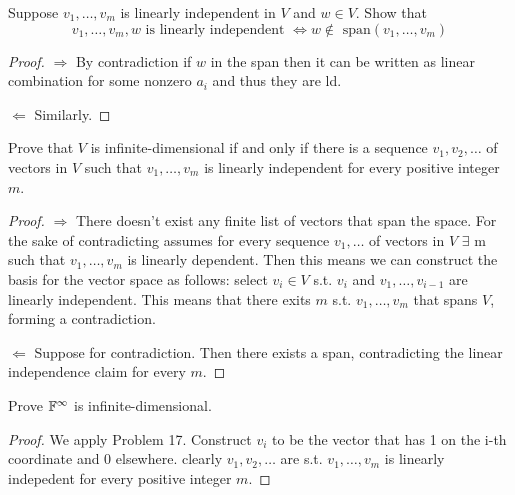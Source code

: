 \documentclass{extarticle}
\begin{document}
\begin{problem}{13}
    Suppose \(v_1, \ldots, v_m\) is linearly independent in \(V\) and 
    \(w \in V\). Show that 
    \[v_1, \ldots, v_m, w \text{ is linearly independent } \Leftrightarrow 
    w \notin \text{ span}(v_1, \ldots, v_m)\]
\end{problem}

\begin{proof}
\(\Rightarrow\) By contradiction if \(w\) in the span then it can be written 
as linear combination for some nonzero \(a_i\) and thus they are ld. 

\(\Leftarrow\) Similarly. 
\end{proof}


\begin{problem}{17}
Prove that \(V\) is infinite-dimensional if and only if there is a sequence 
\(v_1, v_2, \ldots\) of vectors in \(V\) such that \(v_1, \ldots, v_m\) is 
linearly independent for every positive integer \(m\). 
\end{problem}

\begin{proof}
\(\Rightarrow\) There doesn't exist any finite list of vectors that span the space. For 
the sake of contradicting assumes for every sequence  \(v_1, \ldots\) of 
vectors in \(V\) 
\(\exists\) m such that \(v_1, \ldots, v_m\)
is linearly dependent. Then this means we can construct the basis for the vector 
space as follows: select \(v_i \in V\) s.t. \(v_i\) and \(v_1, \ldots, v_{i-1}\)
are linearly independent. This means that there exits \(m\) s.t. \(v_1, \ldots, v_m\)
that spans \(V\), forming a contradiction. 

\(\Leftarrow\) Suppose for contradiction. Then there exists a span, contradicting 
the linear independence claim for every \(m\).

\end{proof}

\begin{problem}{18}
    Prove \(\mathbb{F}^\infty\) is infinite-dimensional. 
\end{problem}

\begin{proof}
We apply Problem 17. Construct \(v_i\) to be the vector that has 1 on the 
i-th coordinate and 0 elsewhere. clearly \(v_1, v_2, \ldots\) are s.t. 
\(v_1, \ldots, v_m\) is linearly indepedent for every positive integer \(m\).
\end{proof}


\newpage 
{}
\end{document}
